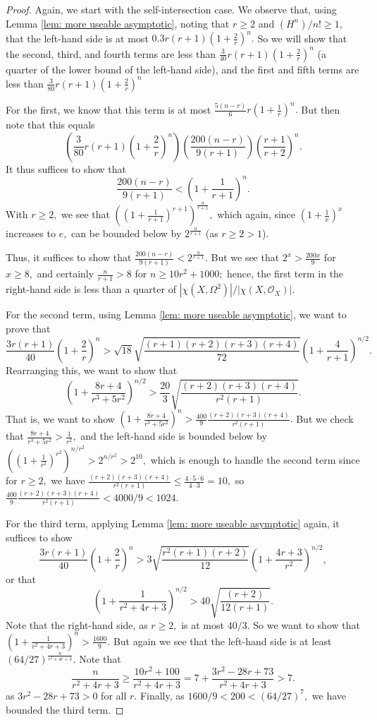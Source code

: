 \documentclass{article}
\theoremstyle{definition}
\theoremstyle{remark}
\begin{document}
\begin{proof}
Again, we start with the self-intersection case. We observe that, using Lemma \ref{lem: more useable asymptotic}, noting that $r \geq 2$ and $(H^n)/n! \geq 1,$ that the left-hand side is at most $0.3 r(r+1) \left(1 + \frac{2}{r}\right)^n.$ So we will show that the second, third, and fourth terms are less than $\frac{3}{40} r(r+1)\left(1 + \frac{2}{r}\right)^n$ (a quarter of the lower bound of the left-hand side), and the first and fifth terms are less than $\frac{3}{80} r(r+1)\left(1 + \frac{2}{r}\right)^n$ 
\par For the first, we know that this term is at most $\frac{5(n-r)}{6} r (1 + \frac{1}{r})^n.$ But then note that this equals \[\left(\frac{3}{80} r(r+1)\left(1 + \frac{2}{r}\right)^n\right) \left(\frac{200(n-r)}{9(r+1)}\right) \left(\frac{r+1}{r+2}\right)^n.\] It thus suffices to show that $$\frac{200(n-r)}{9(r+1)} < \left(1 + \frac{1}{r+1}\right)^n.$$ With $r \geq 2,$ we see that $\left(\left(1 + \frac{1}{r+1}\right)^{r+1}\right)^\frac{n}{r+1},$ which again, since $(1 + \frac{1}{x})^x$ increases to $e,$ can be bounded below by $2^\frac{n}{r+1}$ (as $r \geq 2 > 1$).
\par Thus, it suffices to show that $\frac{200(n-r)}{9(r+1)} < 2^{\frac{n}{r+1}}.$ But we see that $2^x > \frac{200x}{9}$ for $x \geq 8,$ and certainly $\frac{n}{r+1} > 8$ for $n \geq 10r^2 + 1000;$ hence, the first term in the right-hand side is less than a quarter of $|\chi(X, \Omega^2)|/|\chi(X, \mathcal{O}_X)|.$
\par For the second term, using Lemma \ref{lem: more useable asymptotic}, we want to prove that \[\frac{3r(r+1)}{40} \left(1 + \frac{2}{r}\right)^n > \sqrt{18} \sqrt{\frac{(r+1)(r+2)(r+3)(r+4)}{72}} \left( 1 + \frac{4}{r+1} \right)^{n/2}.\] Rearranging this, we want to show that
\[\left( 1 + \frac{8r + 4}{r^3 + 5r^2}\right)^{n/2} > \frac{20}{3} \sqrt{\frac{(r+2)(r+3)(r+4)}{r^2(r+1)}}.\] That is, we want to show $\left( 1 + \frac{8r + 4}{r^3 + 5r^2}\right)^n > \frac{400}{9}\frac{(r+2)(r+3)(r+4)}{r^2(r+1)}.$ But we check that $\frac{8r + 4}{r^3 + 5r^2} > \frac{1}{r^2},$ and the left-hand side is bounded below by $\left(\left(1 + \frac{1}{r^2}\right)^{r^2}\right)^{n/r^2} > 2^{n/r^2} > 2^{10},$ which is enough to handle the second term since for $r \geq 2,$ we have $\frac{(r+2)(r+3)(r+4)}{r^2(r+1)} \leq \frac{4 \cdot 5 \cdot 6}{4 \cdot 3} = 10,$ so $\frac{400}{9}\frac{(r+2)(r+3)(r+4)}{r^2(r+1)} < 4000/9 < 1024.$
\par For the third term, applying Lemma \ref{lem: more useable asymptotic} again, it suffices to show \[\frac{3r(r+1)}{40} \left(1 + \frac{2}{r}\right)^n > 3 \sqrt{\frac{r^2(r+1)(r+2)}{12}} \left(1 + \frac{4r + 3}{r^2} \right)^{n/2},\] or that \[ \left(1 + \frac{1}{r^2 + 4r + 3}\right)^{n/2} > 40\sqrt{\frac{(r+2)}{12(r+1)}}.\] Note that the right-hand side, as $r \geq 2,$ is at most $40/3.$ So we want to show that $\left(1 + \frac{1}{r^2 + 4r + 3}\right)^{n} > \frac{1600}{9}.$ But again we see that the left-hand side is at least $(64/27)^{\frac{n}{r^2 + 4r + 3}}.$ Note that  $$\frac{n}{r^2 + 4r + 3} \geq \frac{10r^2 + 100}{r^2 + 4r + 3}  = 7 + \frac{3r^2 - 28 r + 73}{r^2 + 4r +3} > 7.$$ as $3r^2 - 28r + 73 > 0$ for all $r.$ Finally, as $1600/9 < 200 < (64/27)^7,$ we have bounded the third term.

\end{proof}
\end{document}
